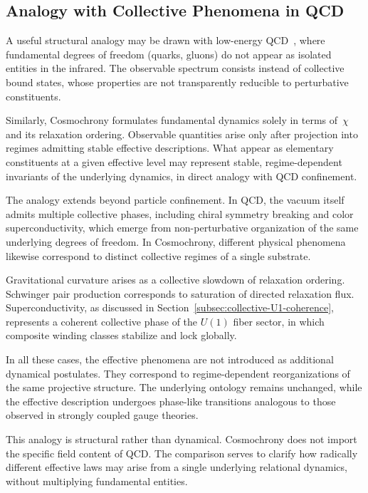 \subsection{Analogy with Collective Phenomena in QCD}
  \label{subsec:analogy-with-collective-phenomena-in-qcd}

  A useful structural analogy may be drawn with low-energy
  QCD~\cite{Shifman2007QCDVacuum}, where fundamental degrees of freedom
  (quarks, gluons) do not appear as isolated entities in the infrared.
  The observable spectrum consists instead of collective bound states,
  whose properties are not transparently reducible to perturbative
  constituents.

  Similarly, Cosmochrony formulates fundamental dynamics solely in terms
  of~$\chi$ and its relaxation ordering.
  Observable quantities arise only after projection into regimes
  admitting stable effective descriptions.
  What appear as elementary constituents at a given effective level may
  represent stable, regime-dependent invariants of the underlying
  dynamics, in direct analogy with QCD confinement.

  The analogy extends beyond particle confinement.
  In QCD, the vacuum itself admits multiple collective phases,
  including chiral symmetry breaking and color superconductivity,
  which emerge from non-perturbative organization of the same
  underlying degrees of freedom.
  In Cosmochrony, different physical phenomena likewise correspond
  to distinct collective regimes of a single substrate.

  Gravitational curvature arises as a collective slowdown of relaxation ordering.
  Schwinger pair production corresponds to saturation of directed relaxation flux.
  Superconductivity, as discussed in Section~\ref{subsec:collective-U1-coherence},
  represents a coherent collective phase of the $U(1)$ fiber sector,
  in which composite winding classes stabilize and lock globally.

  In all these cases, the effective phenomena are not introduced as additional dynamical postulates.
  They correspond to regime-dependent reorganizations of the same projective structure.
  The underlying ontology remains unchanged, while the effective
  description undergoes phase-like transitions analogous to those
  observed in strongly coupled gauge theories.

  This analogy is structural rather than dynamical.
  Cosmochrony does not import the specific field content of QCD.
  The comparison serves to clarify how radically different effective
  laws may arise from a single underlying relational dynamics,
  without multiplying fundamental entities.
